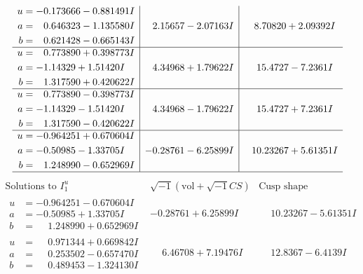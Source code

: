 \documentclass[1p]{elsarticle_modified}
\theoremstyle{definition}
\newcommand{\I}{\sqrt{-1}}
\begin{document}
$$\begin{array}{c|c|c}
\begin{aligned}
u &= -0.173666 - 0.881491 I \\
a &= \phantom{-}0.646323 - 1.135580 I \\
b &= \phantom{-}0.621428 - 0.665143 I\end{aligned}
 & \phantom{-}2.15657 - 2.07163 I & \phantom{-}8.70820 + 2.09392 I \\ \hline\begin{aligned}
u &= \phantom{-}0.773890 + 0.398773 I \\
a &= -1.14329 + 1.51420 I \\
b &= \phantom{-}1.317590 + 0.420622 I\end{aligned}
 & \phantom{-}4.34968 + 1.79622 I & \phantom{-}15.4727 - 7.2361 I \\ \hline\begin{aligned}
u &= \phantom{-}0.773890 - 0.398773 I \\
a &= -1.14329 - 1.51420 I \\
b &= \phantom{-}1.317590 - 0.420622 I\end{aligned}
 & \phantom{-}4.34968 - 1.79622 I & \phantom{-}15.4727 + 7.2361 I \\ \hline\begin{aligned}
u &= -0.964251 + 0.670604 I \\
a &= -0.50985 - 1.33705 I \\
b &= \phantom{-}1.248990 - 0.652969 I\end{aligned}
 & -0.28761 - 6.25899 I & \phantom{-}10.23267 + 5.61351 I\\
 \hline 
 \end{array}$$\newpage$$\begin{array}{c|c|c}  
\text{Solutions to }I^u_{1}& \I (\text{vol} + \sqrt{-1}CS) & \text{Cusp shape}\\
 \hline 
\begin{aligned}
u &= -0.964251 - 0.670604 I \\
a &= -0.50985 + 1.33705 I \\
b &= \phantom{-}1.248990 + 0.652969 I\end{aligned}
 & -0.28761 + 6.25899 I & \phantom{-}10.23267 - 5.61351 I \\ \hline\begin{aligned}
u &= \phantom{-}0.971344 + 0.669842 I \\
a &= \phantom{-}0.253502 - 0.657470 I \\
b &= \phantom{-}0.489453 - 1.324130 I\end{aligned}
 & \phantom{-}6.46708 + 7.19476 I & \phantom{-}12.8367 - 6.4139 I \\ \hline\begin{aligned}

\end{aligned}
\end{array}$$
\end{document}
